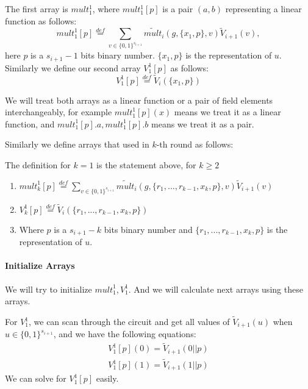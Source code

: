 The first array is $mult_1^1$, where $mult_1^1[p]$ is a pair $(a, b)$ representing a linear function as follows:
$${mult}_1^1[p]\overset{def}{=}\sum_{v\in \{0,1\}^{s_{i+1}}}\tilde{mult}_i(g, \{x_1, p\}, v)\tilde{V}_{i+1}(v),$$
here $p$ is a $s_{i+1}-1$ bits binary number. $\{x_1, p\}$ is the representation of $u$. Similarly we define our second array ${V}_1^1[p]$ as follows:
$$V_1^1[p]\overset{def}{=}\tilde{V}_i(\{x_1, p\})$$

We will treat both arrays as a linear function or a pair of field elements interchangeably, for example ${mult}_1^1[p](x)$ means we treat it as a linear function, and ${mult}_1^1[p].a, {mult}_1^1[p].b$ means we treat it as a pair.

Similarly we define arrays that used in $k$-th round as follows:
\begin{definition}

	The definition for $k=1$ is the statement above, for $k\ge 2$
	\begin{enumerate}
		\item ${mult}_k^1[p]\overset{def}{=}\sum_{v\in \{0, 1\}^{s_{i+1}}}\tilde{mult}_i(g, \{r_1, ..., r_{k-1}, x_k, p\}, v)\tilde{V}_{i+1}(v)$
		\item ${V}_k^1[p]\overset{def}{=}\tilde{V}_i(\{r_1, ..., r_{k-1}, x_k, p\})$
		\item Where $p$ is a $s_{i+1}-k$ bits binary number and $\{r_1, ..., r_{k-1}, x_k, p\}$ is the representation of $u$.
	\end{enumerate}
\end{definition}

\paragraph{Initialize Arrays}
We will try to initialize ${mult}_1^1, {V}_1^1$. And we will calculate next arrays using these arrays.

For ${V}_1^1$, we can scan through the circuit and get all values of $\tilde{V}_{i+1}(u)$ when $u \in \{0, 1\}^{s_{i+1}}$, and we have the following equations:
\begin{align*}
{V}_1^1[p](0)=\tilde{V}_{i+1}(0||p)\\
{V}_1^1[p](1)=\tilde{V}_{i+1}(1||p)
\end{align*}
We can solve for ${V}_1^1[p]$ easily.

